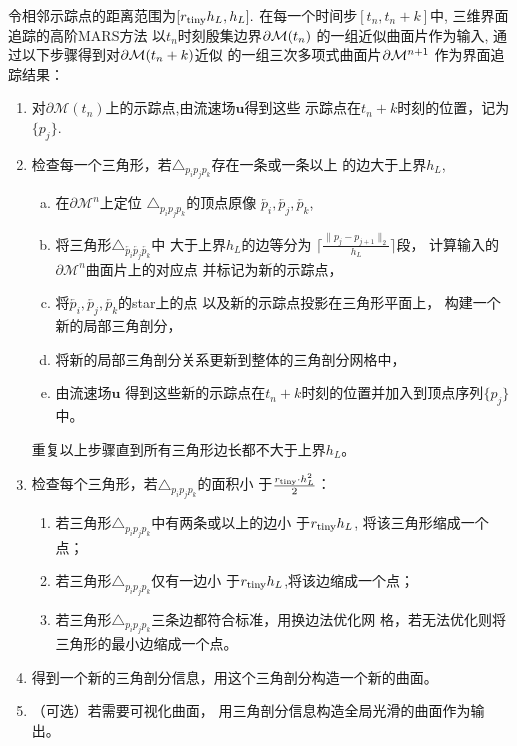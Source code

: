 

\begin{defn}[三维界面追踪的高阶MARS方法]\label{defn:algorithm}
  令相邻示踪点的距离范围为$[r_\textmd{tiny}h_L,h_L].$
在每一个时间步$[t_n,t_n+k]$中,
三维界面追踪的高阶MARS方法
以$t_n$时刻殷集边界$\partial {\cal M}(t_n)$
的一组近似曲面片作为输入,
通过以下步骤得到对$\partial {\cal M}(t_n+k)$近似
的一组三次多项式曲面片$\partial {\cal M}^{n+1}$
作为界面追踪结果：
  \begin{enumerate}[{(SplineMARS}-1)]
    \setlength{\itemsep}{0pt} \setlength{\parsep}{0pt}
    \setlength{\parskip}{0pt}
  \item
    对$\partial\mathcal{M}(t_n)$上的示踪点,由流速场$\mathbf{u}$得到这些
    示踪点在$t_n+k$时刻的位置，记为$\{p_j\}$.
  \item 检查每一个三角形，若$\triangle_{p_i p_j p_k}$存在一条或一条以上
    的边大于上界$h_L$,　
    \begin{enumerate}[(a)]
    \item
      在$\partial\mathcal{M}^n$上定位
      $\triangle_{p_i p_j p_k}$的顶点原像
      $\overleftarrow{p_i},\overleftarrow{p_j},\overleftarrow{p_k}$,
    \item  将三角形$\triangle_{\overleftarrow{p_i}
        \overleftarrow{p_j}\overleftarrow{p_k}}$中
      大于上界$h_L$的边等分为
      $\lceil\frac{\lVert p_j-p_{j+1}\rVert_2}{h_L}\rceil $段，
      计算输入的$\partial\mathcal{M}^n$曲面片上的对应点
      并标记为新的示踪点，
    \item  将$\overleftarrow{p_i},　\overleftarrow{p_j},　
      \overleftarrow{p_k}$的star上的点
      以及新的示踪点投影在三角形平面上，
      构建一个新的局部三角剖分，
    \item 将新的局部三角剖分关系更新到整体的三角剖分网格中，
    \item
      由流速场$\mathbf{u}$
      得到这些新的示踪点在$t_n+k$时刻的位置并加入到顶点序列$\{p_j\}$中。
    \end{enumerate}
    重复以上步骤直到所有三角形边长都不大于上界$h_L$。
  \item 检查每个三角形，若$\triangle_{p_i p_j p_k}$的面积小
    于$\frac{r_{\textmd{tiny}} \cdot h_L^2}{2}$：
    \begin{enumerate}
    \item
      若三角形$\triangle_{p_i p_j p_k}$中有两条或以上的边小
      于$r_\textmd{tiny}h_L$, 将该三角形缩成一个点；
    \item
      若三角形$\triangle_{p_i p_j p_k}$仅有一边小
      于$r_\textmd{tiny}h_L$,将该边缩成一个点；
    \item
      若三角形$\triangle_{p_i p_j p_k}$三条边都符合标准，用换边法优化网
      格，若无法优化则将三角形的最小边缩成一个点。
    \end{enumerate}
  \item 得到一个新的三角剖分信息，用这个三角剖分构造一个新的曲面。
  \item （可选）若需要可视化曲面，
    用三角剖分信息构造全局光滑的曲面作为输出。
  \end{enumerate}
\end{defn}

